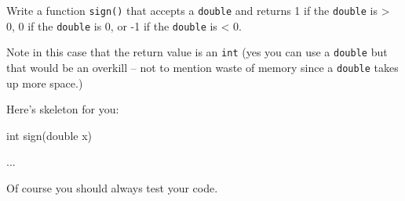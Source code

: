 Write a function \texttt{sign()} that accepts a \texttt{double} and returns 1 if the \texttt{double} is > 0, 0 if the \texttt{double} is 0, or -1 if the \texttt{double} is < 0.



Note in this case that the return value is an \texttt{int} (yes you can use a \texttt{double} but that would be an overkill -- not to mention waste of memory since a \texttt{double} takes up more space.)



Here's skeleton for you:



\begin{consolethree}[escapeinside=||]

int sign(double x)

{

    ...

}

\end{consolethree}



Of course you should always test your code.

